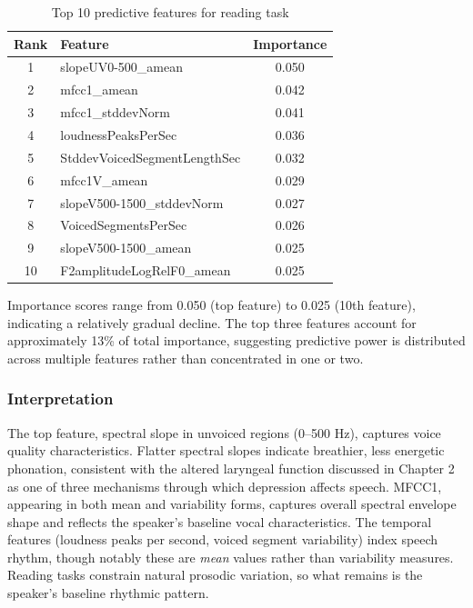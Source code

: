 \begin{table}[h]
\centering
\caption{Top 10 predictive features for reading task}
\label{tab:reading-features}
\begin{tabular}{clc}
\hline
\textbf{Rank} & \textbf{Feature} & \textbf{Importance} \\
\hline
1 & slopeUV0-500\_amean & 0.050 \\
2 & mfcc1\_amean & 0.042 \\
3 & mfcc1\_stddevNorm & 0.041 \\
4 & loudnessPeaksPerSec & 0.036 \\
5 & StddevVoicedSegmentLengthSec & 0.032 \\
6 & mfcc1V\_amean & 0.029 \\
7 & slopeV500-1500\_stddevNorm & 0.027 \\
8 & VoicedSegmentsPerSec & 0.026 \\
9 & slopeV500-1500\_amean & 0.025 \\
10 & F2amplitudeLogRelF0\_amean & 0.025 \\
\hline
\end{tabular}
\end{table}

Importance scores range from 0.050 (top feature) to 0.025 (10th feature), indicating a relatively gradual decline. The top three features account for approximately 13\% of total importance, suggesting predictive power is distributed across multiple features rather than concentrated in one or two.

\subsubsection{Interpretation}

The top feature, spectral slope in unvoiced regions (0--500 Hz), captures voice quality characteristics. Flatter spectral slopes indicate breathier, less energetic phonation, consistent with the altered laryngeal function discussed in Chapter 2 as one of three mechanisms through which depression affects speech. MFCC1, appearing in both mean and variability forms, captures overall spectral envelope shape and reflects the speaker's baseline vocal characteristics. The temporal features (loudness peaks per second, voiced segment variability) index speech rhythm, though notably these are \textit{mean} values rather than variability measures. Reading tasks constrain natural prosodic variation, so what remains is the speaker's baseline rhythmic pattern.

